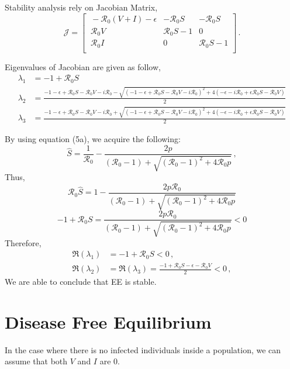 \documentclass[12pt]{article}
\newcommand{\R}{\mathcal{R}}
\begin{document}
Stability analysis rely on Jacobian Matrix,
\begin{equation}
\mathcal{J} =
\begin{bmatrix}
    \ -\R_0 (V+I)-\epsilon       & -\R_0 S     &-\R_0 S\\
    \ \R_0 V       & \R_0 S-1    &0\\
    \ \R_0 I       &0     &\R_0 S-1\\
\end{bmatrix}\,.
\end{equation}

Eigenvalues of Jacobian are given as follow,
\begin{subequations}
\begin{align}
\lambda_1&=-1+\R_0 S\\
\lambda_2&=\frac{-1-\epsilon+\R_0 S-\R_0 V-i\R_0-\sqrt{(-1-\epsilon+\R_0 S-\R_0 V-i\R_0)^2+4(-\epsilon-i\R_0+\epsilon\R_0 S-\R_0 V)}}{2}\\
\lambda_3&=\frac{-1-\epsilon+\R_0 S-\R_0 V-i\R_0+\sqrt{(-1-\epsilon+\R_0 S-\R_0 V-i\R_0)^2+4(-\epsilon-i\R_0+\epsilon\R_0 S-\R_0 V)}}{2}
\end{align}
\end{subequations}

By using equation (5a), we acquire the following:
\begin{equation}
\hat{S}=\frac{1}{\R_0}-\frac{2p}{(\R_0 -1)+ \sqrt{(\R_0-1)^2+4\R_0 p}}\,,
\end{equation}
Thus,
\begin{equation}
\R_0\hat{S}=1-\frac{2p\R_0}{(\R_0 -1)+ \sqrt{(\R_0-1)^2+4\R_0 p}}
\end{equation}
\begin{equation}
-1+\R_0 S=\frac{2p\R_0}{(\R_0 -1)+ \sqrt{(\R_0-1)^2+4\R_0 p}}<0
\end{equation}
Therefore,
\begin{subequations}
\begin{align}
\Re(\lambda_1) &=-1+\R_0 S<0\,,\\
\Re(\lambda_2) &=\Re(\lambda_3)=\frac{-1+\R_0 S-\epsilon-\R_0 V}{2}<0\,,
\end{align}
\end{subequations}
We are able to conclude that EE is stable.
\section{Disease Free Equilibrium}
In the case where there is no infected individuals inside a population, we can assume that both $V$ and $I$ are 0. 
\end{document}

